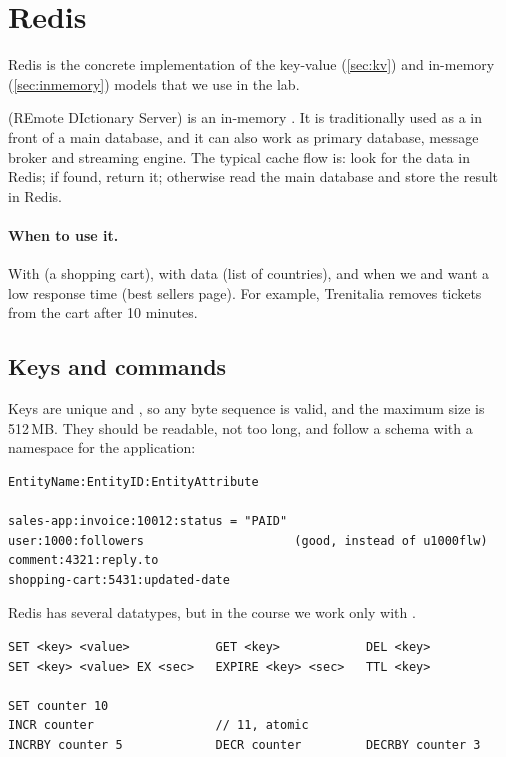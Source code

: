 \section{Redis}\label{sec:redis}

Redis is the concrete implementation of the key-value (\cref{sec:kv}) and in-memory (\cref{sec:inmemory}) models that we use in the lab.

 (REmote DIctionary Server) is an in-memory . It is traditionally used as a  in front of a main database, and it can also work as primary database, message broker and streaming engine. The typical cache flow is: look for the data in Redis; if found, return it; otherwise read the main database and store the result in Redis.

\paragraph{When to use it.} With  (a shopping cart), with data  (list of countries), and when we  and want a low response time (best sellers page). For example, Trenitalia removes tickets from the cart after 10 minutes.

\subsection{Keys and commands}
Keys are unique and , so any byte sequence is valid, and the maximum size is 512\,MB. They should be readable, not too long, and follow a schema with a namespace for the application:
\begin{lstlisting}
EntityName:EntityID:EntityAttribute

sales-app:invoice:10012:status = "PAID"
user:1000:followers                     (good, instead of u1000flw)
comment:4321:reply.to
shopping-cart:5431:updated-date
\end{lstlisting}

Redis has several datatypes, but in the course we work only with .
\begin{lstlisting}
SET <key> <value>            GET <key>            DEL <key>
SET <key> <value> EX <sec>   EXPIRE <key> <sec>   TTL <key>

SET counter 10
INCR counter                 // 11, atomic
INCRBY counter 5             DECR counter         DECRBY counter 3
\end{lstlisting}

